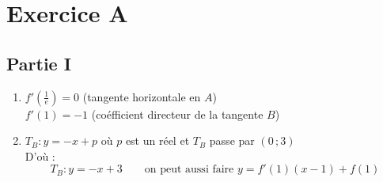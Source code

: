 \documentclass{scrartcl}
\begin{document}
    \section*{Exercice A}
    \begin{adjustwidth}{2em}{0pt}
        \subsection*{Partie I}
        \begin{enumerate}
            \item	$f'(\frac{1}{e})=0$ (tangente horizontale en $A$) \\ $f'(1)=-1$ (coéfficient directeur de la tangente $B$)
            \item   $T_B:y=-x+p$ où $p$ est un réel et $T_B$ passe par $(0\,;3)$ \\ D'où : \[\boxed{T_B:y=-x+3} \qquad \text{on peut aussi faire }y=f'(1)(x-1)+f(1)\]
        \end{enumerate}

\end{adjustwidth}
\end{document}
